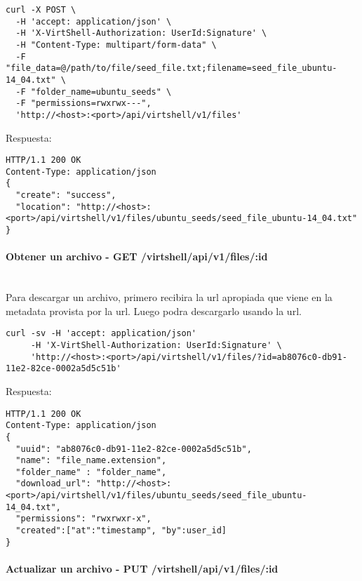 \begin{lstlisting}[style=json]
curl -X POST \
  -H 'accept: application/json' \
  -H 'X-VirtShell-Authorization: UserId:Signature' \
  -H "Content-Type: multipart/form-data" \
  -F "file_data=@/path/to/file/seed_file.txt;filename=seed_file_ubuntu-14_04.txt" \
  -F "folder_name=ubuntu_seeds" \
  -F "permissions=rwxrwx---",
  'http://<host>:<port>/api/virtshell/v1/files'
\end{lstlisting}

\vspace{1cm}
Respuesta:
\vspace{1cm}

\begin{lstlisting}[style=json]
HTTP/1.1 200 OK
Content-Type: application/json
{ 
  "create": "success",
  "location": "http://<host>:<port>/api/virtshell/v1/files/ubuntu_seeds/seed_file_ubuntu-14_04.txt" 
}
\end{lstlisting}

\paragraph{Obtener un archivo - GET /virtshell/api/v1/files/:id} ~\\

Para descargar un archivo, primero recibira la url apropiada que viene en la metadata provista por la url. Luego podra descargarlo usando la url.

\begin{lstlisting}[style=json]
curl -sv -H 'accept: application/json' 
     -H 'X-VirtShell-Authorization: UserId:Signature' \ 
     'http://<host>:<port>/api/virtshell/v1/files/?id=ab8076c0-db91-11e2-82ce-0002a5d5c51b'
\end{lstlisting}

\vspace{1cm}
Respuesta:
\vspace{1cm}

\begin{lstlisting}[style=json]
HTTP/1.1 200 OK
Content-Type: application/json
{
  "uuid": "ab8076c0-db91-11e2-82ce-0002a5d5c51b",
  "name": "file_name.extension",
  "folder_name" : "folder_name",
  "download_url": "http://<host>:<port>/api/virtshell/v1/files/ubuntu_seeds/seed_file_ubuntu-14_04.txt",
  "permissions": "rwxrwxr-x",
  "created":["at":"timestamp", "by":user_id] 
}
\end{lstlisting}

\paragraph{Actualizar un archivo - PUT /virtshell/api/v1/files/:id} ~\\

